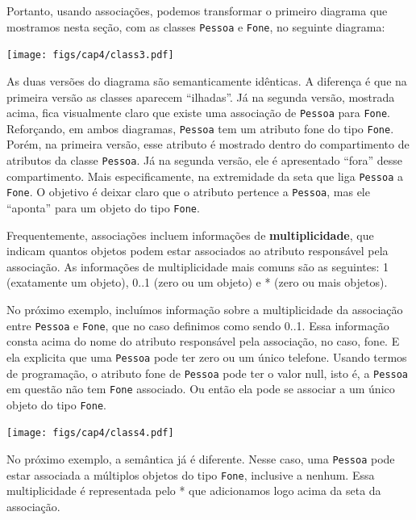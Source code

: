 \documentclass[
  11pt,
  twoside]{book}
\newcommand{\passthrough}[1]{#1}
\begin{document}
Portanto, usando associações, podemos transformar o primeiro diagrama
que mostramos nesta seção, com as classes
\passthrough{\lstinline!Pessoa!} e \passthrough{\lstinline!Fone!}, no
seguinte diagrama:

\texttt{[image: figs/cap4/class3.pdf]}

As duas versões do diagrama são semanticamente idênticas. A diferença é
que na primeira versão as classes aparecem ``ilhadas''. Já na segunda
versão, mostrada acima, fica visualmente claro que existe uma associação
de \passthrough{\lstinline!Pessoa!} para \passthrough{\lstinline!Fone!}.
Reforçando, em ambos diagramas, \passthrough{\lstinline!Pessoa!} tem um
atributo fone do tipo \passthrough{\lstinline!Fone!}. Porém, na primeira
versão, esse atributo é mostrado dentro do compartimento de atributos da
classe \passthrough{\lstinline!Pessoa!}. Já na segunda versão, ele é
apresentado ``fora'' desse compartimento. Mais especificamente, na
extremidade da seta que liga \passthrough{\lstinline!Pessoa!} a
\passthrough{\lstinline!Fone!}. O objetivo é deixar claro que o atributo
pertence a \passthrough{\lstinline!Pessoa!}, mas ele ``aponta'' para um
objeto do tipo \passthrough{\lstinline!Fone!}.

 Frequentemente, associações incluem
informações de \textbf{multiplicidade}, que indicam quantos objetos
podem estar associados ao atributo responsável pela associação. As
informações de multiplicidade mais comuns são as seguintes: 1
(exatamente um objeto), 0..1 (zero ou um objeto) e * (zero ou mais
objetos).

No próximo exemplo, incluímos informação sobre a multiplicidade da
associação entre \passthrough{\lstinline!Pessoa!} e
\passthrough{\lstinline!Fone!}, que no caso definimos como sendo 0..1.
Essa informação consta acima do nome do atributo responsável pela
associação, no caso, fone. E ela explicita que uma
\passthrough{\lstinline!Pessoa!} pode ter zero ou um único telefone.
Usando termos de programação, o atributo fone de
\passthrough{\lstinline!Pessoa!} pode ter o valor null, isto é, a
\passthrough{\lstinline!Pessoa!} em questão não tem
\passthrough{\lstinline!Fone!} associado. Ou então ela pode se associar
a um único objeto do tipo \passthrough{\lstinline!Fone!}.

\texttt{[image: figs/cap4/class4.pdf]}

No próximo exemplo, a semântica já é diferente. Nesse caso, uma
\passthrough{\lstinline!Pessoa!} pode estar associada a múltiplos
objetos do tipo \passthrough{\lstinline!Fone!}, inclusive a nenhum. Essa
multiplicidade é representada pelo * que adicionamos logo acima da seta
da associação.
\end{document}
